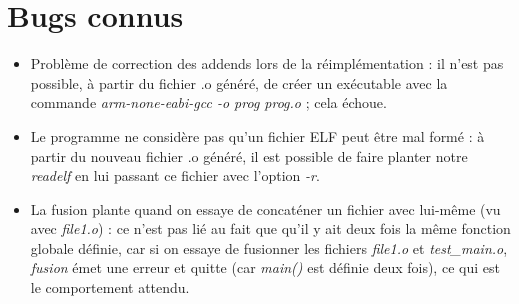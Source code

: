 \documentclass[a4paper,11pt]{article}
\begin{document}
\section{Bugs connus}
\begin{itemize}
\item Problème de correction des addends lors de la réimplémentation : il n'est pas possible, à partir du fichier .o généré, de créer un exécutable avec la commande \textit{arm-none-eabi-gcc -o prog prog.o} ; cela échoue.
\item Le programme ne considère pas qu'un fichier ELF peut être mal formé : à partir du nouveau fichier .o généré, il est possible de faire planter notre \textit{readelf} en lui passant ce fichier avec l'option \textit{-r}.
\item La fusion plante quand on essaye de concaténer un fichier avec lui-même (vu avec \textit{file1.o}) : ce n'est pas lié au fait que qu'il y ait deux fois la même fonction globale définie, car si on essaye de fusionner les fichiers \textit{file1.o} et \textit{test\_main.o}, \textit{fusion} émet une erreur et quitte (car \textit{main()} est définie deux fois), ce qui est le comportement attendu.
\end{itemize}
\end{document}
